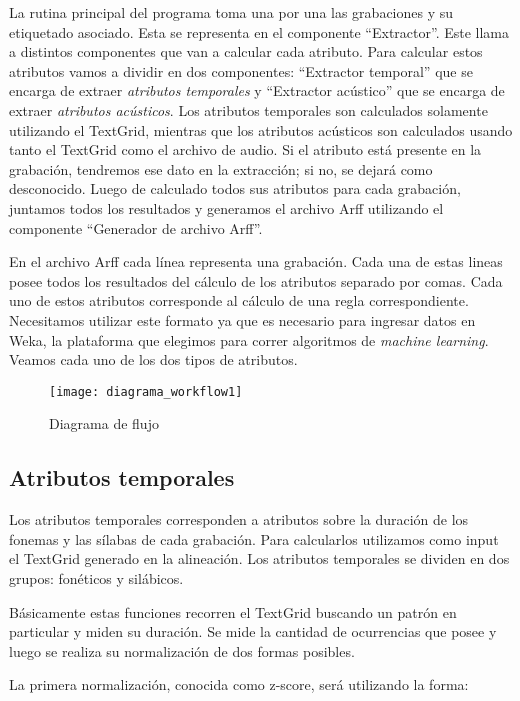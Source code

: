 La rutina principal del programa toma una por una las grabaciones y su etiquetado asociado. Esta se representa en el componente ``Extractor''. Este llama a distintos componentes que van a calcular cada atributo. Para calcular estos atributos vamos a dividir en dos componentes: ``Extractor temporal'' que se encarga de extraer \textit{atributos temporales} y ``Extractor acústico'' que se encarga de extraer \textit{atributos acústicos}. Los atributos temporales son calculados solamente utilizando el TextGrid, mientras que los atributos acústicos son calculados usando tanto el TextGrid como el archivo de audio. Si el atributo está presente en la grabación, tendremos ese dato en la extracción; si no, se dejará como desconocido. Luego de calculado todos sus atributos para cada grabación, juntamos todos los resultados y generamos el archivo Arff utilizando el componente ``Generador de archivo Arff''.

En el archivo Arff cada línea representa una grabación.  Cada una de estas lineas posee todos los resultados del cálculo de los atributos separado por comas. Cada uno de estos atributos corresponde al cálculo de una regla correspondiente. Necesitamos utilizar este formato ya que es necesario para ingresar datos en Weka, la plataforma que elegimos para correr algoritmos de \textit{machine learning}. Veamos cada uno de los dos tipos de atributos.

\begin{figure}[h!]
    \centerline{\texttt{[image: diagrama\_workflow1]} }
    \caption{Diagrama de flujo}
    \label{workflow}
\end{figure}

\subsection{Atributos temporales}

Los atributos temporales corresponden a atributos sobre la duración de los fonemas y las sílabas de cada grabación. Para calcularlos utilizamos como input el TextGrid generado en la alineación. Los atributos temporales se dividen en dos grupos: fonéticos y silábicos. 

Básicamente estas funciones recorren el TextGrid buscando un patrón en particular y miden su duración. Se mide la cantidad de ocurrencias que posee y luego se realiza su normalización de dos formas posibles. 

La primera normalización, conocida como z-score, será utilizando la forma:

